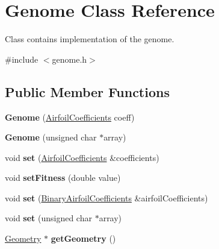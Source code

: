 \hypertarget{class_genome}{}\section{Genome Class Reference}
\label{class_genome}


Class contains implementation of the genome.  




{\ttfamily \#include $<$genome.\+h$>$}

\subsection*{Public Member Functions}
\begin{DoxyCompactItemize}
\item 
\mbox{\label{class_genome_a2a9830ff70a104defa32311a0df1b23b}} 
{\bfseries Genome} (\hyperlink{struct_airfoil_coefficients}{Airfoil\+Coefficients} coeff)
\item 
\mbox{\label{class_genome_a010985b266e041f3c96174aa0e90f8fc}} 
{\bfseries Genome} (unsigned char $\ast$array)
\item 
\mbox{\label{class_genome_a2230db644307d8ff96a908ad0eb20dd5}} 
void {\bfseries set} (\hyperlink{struct_airfoil_coefficients}{Airfoil\+Coefficients} \&coefficients)
\item 
\mbox{\label{class_genome_a8ebe6f37306c3aa87a8d711ec778609f}} 
void {\bfseries set\+Fitness} (double value)
\item 
\mbox{\label{class_genome_adee73c2b3f2158273e52e9aad0709023}} 
void {\bfseries set} (\hyperlink{struct_binary_airfoil_coefficients}{Binary\+Airfoil\+Coefficients} \&airfoil\+Coefficients)
\item 
\mbox{\label{class_genome_ae3adc37122e4fc822ce1c322d4b6d726}} 
void {\bfseries set} (unsigned char $\ast$array)
\item 
\mbox{\label{class_genome_a80747aa266026e16dfdaf1449ba5c8aa}} 
\hyperlink{class_geometry}{Geometry} $\ast$ {\bfseries get\+Geometry} ()
\item 
\mbox{\label{class_genome_a3b61a1cd0050ad1297867a0fc42736a6}} 

\end{DoxyCompactItemize}
